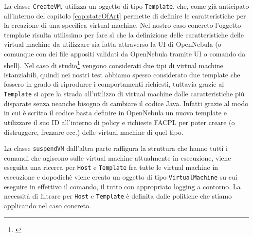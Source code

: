 La classe \texttt{CreateVM}, utilizza un oggetto di tipo \texttt{Template}, che, come già anticipato all'interno del capitolo \ref{cap:stateOfArt} permette di definire le caratteristiche per la creazione di una specifica virtual machine. Nel nostro caso concreto l'oggetto template risulta utilissimo per fare sì che la definizione delle caratteristiche delle virtual machine da utilizzare sia fatta attraverso la UI di OpenNebula (o comunque con dei file appositi validati da OpenNebula tramite UI o comando da shell). Nel caso di studio\footnote{\cite{10.1007/978-3-319-08260-8_6}} vengono considerati due tipi di virtual machine istanziabili, quindi nei nostri test abbiamo spesso considerato due template che fossero in grado di riprodurre i comportamenti richiesti, tuttavia grazie al \texttt{Template} si apre la strada all'utilizzo di virtual machine dalle caratteristiche più disparate senza neanche bisogno di cambiare il codice Java. Infatti grazie al modo in cui è scritto il codice basta definire in OpenNebula un nuovo template e utilizzare il suo ID all'interno di policy e richieste FACPL per poter creare (o distruggere, frezzare ecc.) delle virtual machine di quel tipo.\medbreak

La classe \texttt{suspendVM} dall'altra parte raffigura la struttura che hanno tutti i comandi che agiscono sulle virtual machine attualmente in esecuzione, viene eseguita una ricerca per \texttt{Host} e \texttt{Template} fra tutte le virtual machine in esecuzione e dopodichè viene creato un oggetto di tipo \texttt{VirtualMachine} su cui eseguire in effettivo il comando, il tutto con appropriato logging a contorno. La necessità di filtrare per \texttt{Host} e \texttt{Template} è definita dalle politiche che stiamo applicando nel caso concreto.

